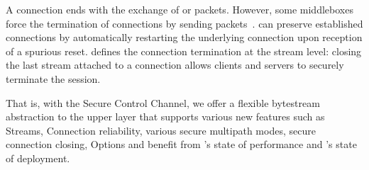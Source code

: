 A \tcp connection ends with the exchange of \fin or \rst packets. However, some
middleboxes force the termination of \tcp connections by sending \rst
packets~\cite{rfc3360,weaver2009detecting}. \tcpls can preserve established
connections by automatically restarting the underlying \tcp connection upon
reception of a spurious reset. \tcpls defines the connection termination at the
stream level: closing the last stream attached to a \tcp connection allows
clients and servers to securely terminate the \tcpls session.

That is, with the Secure Control Channel, we offer a flexible bytestream
abstraction to the upper layer that supports various new features such as
Streams, Connection reliability, various secure multipath modes, secure
connection closing,  \tcp Options and benefit from \tcp's state of performance
and \tls's state of deployment.


